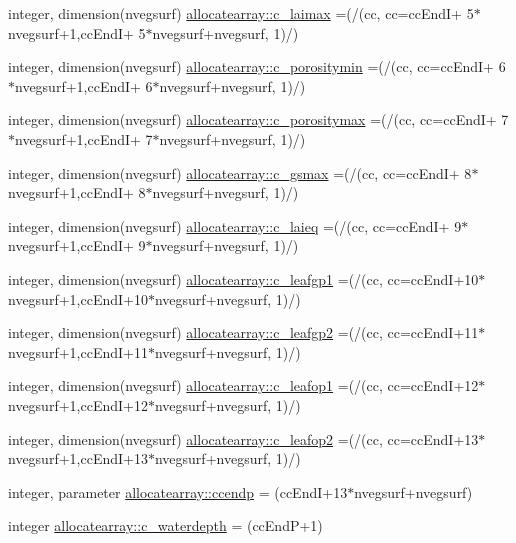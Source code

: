 \begin{DoxyCompactItemize}
\item 
integer, dimension(nvegsurf) \hyperlink{namespaceallocatearray_a3879c23638459d93fbf49398238d480d}{allocatearray\+::c\+\_\+laimax} =(/(cc, cc=cc\+EndI+ 5$\ast$nvegsurf+1,cc\+EndI+ 5$\ast$nvegsurf+nvegsurf, 1)/)
\item 
integer, dimension(nvegsurf) \hyperlink{namespaceallocatearray_ad1692d16ac9e6c1a290140e7e6472a33}{allocatearray\+::c\+\_\+porositymin} =(/(cc, cc=cc\+EndI+ 6$\ast$nvegsurf+1,cc\+EndI+ 6$\ast$nvegsurf+nvegsurf, 1)/)
\item 
integer, dimension(nvegsurf) \hyperlink{namespaceallocatearray_acd03bda7378d9fdd4799f1e67d4ea05c}{allocatearray\+::c\+\_\+porositymax} =(/(cc, cc=cc\+EndI+ 7$\ast$nvegsurf+1,cc\+EndI+ 7$\ast$nvegsurf+nvegsurf, 1)/)
\item 
integer, dimension(nvegsurf) \hyperlink{namespaceallocatearray_a298574bfb3fe39217e94ca3a41541a29}{allocatearray\+::c\+\_\+gsmax} =(/(cc, cc=cc\+EndI+ 8$\ast$nvegsurf+1,cc\+EndI+ 8$\ast$nvegsurf+nvegsurf, 1)/)
\item 
integer, dimension(nvegsurf) \hyperlink{namespaceallocatearray_ae56916b143641c9b88a8877a6efd23d9}{allocatearray\+::c\+\_\+laieq} =(/(cc, cc=cc\+EndI+ 9$\ast$nvegsurf+1,cc\+EndI+ 9$\ast$nvegsurf+nvegsurf, 1)/)
\item 
integer, dimension(nvegsurf) \hyperlink{namespaceallocatearray_ad2db44e21325d357681aede71f6ceba1}{allocatearray\+::c\+\_\+leafgp1} =(/(cc, cc=cc\+EndI+10$\ast$nvegsurf+1,cc\+EndI+10$\ast$nvegsurf+nvegsurf, 1)/)
\item 
integer, dimension(nvegsurf) \hyperlink{namespaceallocatearray_a4c3400e16d4412563d86fb86ca9fd369}{allocatearray\+::c\+\_\+leafgp2} =(/(cc, cc=cc\+EndI+11$\ast$nvegsurf+1,cc\+EndI+11$\ast$nvegsurf+nvegsurf, 1)/)
\item 
integer, dimension(nvegsurf) \hyperlink{namespaceallocatearray_aebfaf59540cf6f07c6a4e31ba8300bda}{allocatearray\+::c\+\_\+leafop1} =(/(cc, cc=cc\+EndI+12$\ast$nvegsurf+1,cc\+EndI+12$\ast$nvegsurf+nvegsurf, 1)/)
\item 
integer, dimension(nvegsurf) \hyperlink{namespaceallocatearray_af3a3b26a0669c8172211b1f09b34e9fa}{allocatearray\+::c\+\_\+leafop2} =(/(cc, cc=cc\+EndI+13$\ast$nvegsurf+1,cc\+EndI+13$\ast$nvegsurf+nvegsurf, 1)/)
\item 
integer, parameter \hyperlink{namespaceallocatearray_ae2a7ed1b10fa2033873854a4ea5c91e5}{allocatearray\+::ccendp} = (cc\+EndI+13$\ast$nvegsurf+nvegsurf)
\item 
integer \hyperlink{namespaceallocatearray_a6a3bb31820fe8c29a52acb94877f5cae}{allocatearray\+::c\+\_\+waterdepth} = (cc\+EndP+1)

\end{DoxyCompactItemize}
